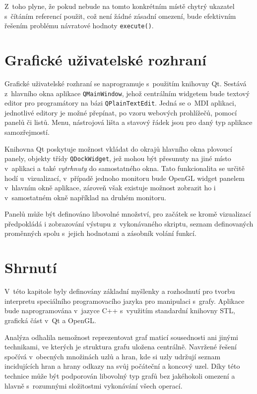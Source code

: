 \documentclass[11pt,twoside,a4paper]{book}
\begin{document}
Z~toho plyne, že pokud nebude na tomto konkrétním místě chytrý ukazatel s~čítáním referencí použit, což není žádné zásadní omezení, bude efektivním řešením problému návratové hodnoty \texttt{execute()}.


\section{Grafické uživatelské rozhraní}

Grafické uživatelské rozhraní se naprogramuje s~použitím knihovny Qt. Sestává z~hlav\-ní\-ho okna aplikace \texttt{QMainWindow}, jehož centrálním widgetem bude textový editor pro programátory na bázi \texttt{QPlainTextEdit}. Jedná se o~MDI aplikaci, jednotlivé editory je možné přepínat, po vzoru webových prohlížečů, pomocí panelů či listů. Menu, nástrojová lišta a stavový řádek jsou pro daný typ aplikace samozřejmostí.

Knihovna Qt poskytuje možnost vkládat do okrajů hlavního okna plovoucí panely, objekty třídy \texttt{QDockWidget}, jež mohou být přesunuty na jiné místo v~aplikaci a také \textit{vytrhnuty} do samostatného okna. Tato funkcionalita se určitě hodí u~vizualizací, v~případě jednoho monitoru bude OpenGL widget panelem v~hlavním okně aplikace, zároveň však existuje možnost zobrazit ho i v~samostatném okně například na druhém monitoru.

Panelů může být definováno libovolné množství, pro začátek se kromě vizualizací před\-po\-klá\-dá i zobrazování výstupu z~vykonávaného skriptu, seznam definovaných proměnných spolu s~jejich hodnotami a zásobník volání funkcí.


\section{Shrnutí}

V~této kapitole byly definovány základní myšlenky a rozhodnutí pro tvorbu interpretu spe\-ci\-ál\-ní\-ho programovacího jazyka pro manipulaci s~grafy. Aplikace bude naprogramována v~jazyce C++ s~využitím standardní knihovny STL, grafická část v~Qt a OpenGL.

Analýza odhalila nemožnost reprezentovat graf maticí sousednosti ani jinými technikami, ve kterých je struktura grafu uložena centrálně. Navržené řešení spočívá v~obecných množinách uzlů a hran, kde si uzly udržují seznam incidujících hran a hrany odkazy na svůj počáteční a koncový uzel. Díky této technice může být podporován libovolný typ grafů bez jakéhokoli omezení a hlavně s~rozumnými složitostmi vykonávání všech operací.
\end{document}
